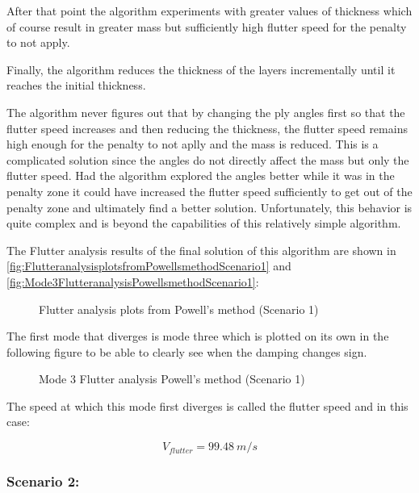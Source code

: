 After that point the algorithm experiments with greater values of thickness which of course result in greater mass but sufficiently high flutter speed for the penalty to not apply.

Finally, the algorithm reduces the thickness of the layers incrementally until it reaches the initial thickness.

The algorithm never figures out that by changing the ply angles first so that the flutter speed increases and then reducing the thickness, the flutter speed remains high enough for the penalty to not aplly and the mass is reduced. This is a complicated solution since the angles do not directly affect the mass but only the flutter speed. Had the algorithm explored the angles better while it was in the penalty zone it could have increased the flutter speed sufficiently to get out of the penalty zone and ultimately find a better solution. Unfortunately, this behavior is quite complex and is beyond the capabilities of this relatively simple algorithm.

The Flutter analysis results of the final solution of this algorithm are
shown in \autoref{fig:FlutteranalysisplotsfromPowellsmethodScenario1} and \autoref{fig:Mode3FlutteranalysisPowellsmethodScenario1}:

\begin{figure}[H]
    \centering
    
    \caption{Flutter analysis plots from Powell's method (Scenario 1)}
    \label{fig:FlutteranalysisplotsfromPowellsmethodScenario1}
\end{figure}

The first mode that diverges is mode three which is plotted on its own in the following figure to be able to clearly see when the damping
changes sign.

\begin{figure}[H]
    \centering
    
    \caption{Mode 3 Flutter analysis Powell's method (Scenario 1)}
    \label{fig:Mode3FlutteranalysisPowellsmethodScenario1}
\end{figure}

The speed at which this mode first diverges is called the flutter speed
and in this case:

\begin{equation}
V_{flutter} = 99.48\ m/s
\end{equation}

\subsubsection{Scenario 2:}

